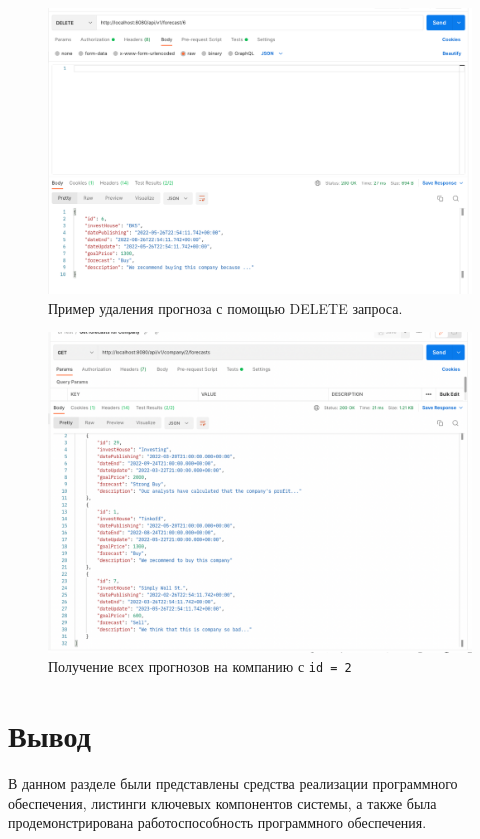 \begin{figure}[h!]
	\begin{center}
		\includegraphics[scale=0.44]{img/delete.png}
	\end{center}
	\captionsetup{justification=centering}
	\caption{Пример удаления прогноза с помощью DELETE запроса.}
	\label{img:delete-example}
\end{figure}

\newpage

\begin{figure}[h!]
	\begin{center}
		\includegraphics[scale=0.44]{img/get.png}
	\end{center}
	\captionsetup{justification=centering}
	\caption{Получение всех прогнозов на компанию с \texttt{id = 2}}
	\label{img:get-example}
\end{figure}

\section*{Вывод}

В данном разделе были представлены средства реализации программного обеспечения, листинги ключевых компонентов системы, а также была продемонстрирована работоспособность программного обеспечения.